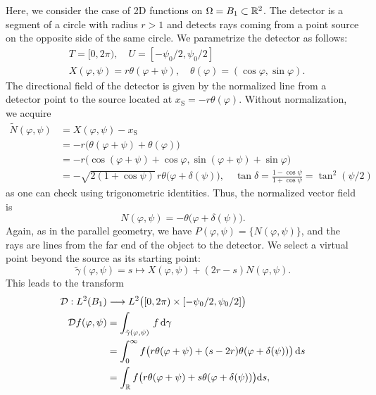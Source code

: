 \documentclass{amsart}
\renewcommand*{\phi}{\varphi}
\begin{document}
\begin{example}
 Here, we consider the case of 2D functions on $\Omega = B_1 \subset {\ensuremath{\mathbb{R}}}^2$. The detector is a segment of a circle with radius $r > 1$ and 
 detects rays coming from a point source on the opposite side of the same circle. We parametrize the detector as follows:
 \begin{align*}
  & T = [0, 2\pi),\quad U = [-\psi_0/2, \psi_0/2] \\
  & X(\phi, \psi) = r \theta(\phi + \psi), \quad \theta(\phi) = (\cos\phi, \sin\phi).
 \end{align*}
 The directional field of the detector is given by the normalized line from a detector point to the source located at 
 $x_{\mathrm{S}} = -r \theta(\phi)$. Without normalization, we acquire
 \begin{align*}
  \tilde N(\phi, \psi) 
  &= X(\phi, \psi) - x_{\mathrm{S}} \\
  &= - r \big(\theta(\phi + \psi) + \theta(\phi)\big) \\
  &= - r \big(\cos(\phi + \psi) + \cos\phi, \sin(\phi + \psi) + \sin\phi \big)\\
  &= - \sqrt{2(1 + \cos\psi)}\, r \theta\big(\phi + \delta(\psi)\big), \quad \tan\delta = \frac{1 - \cos\psi}{1 + \cos\psi} 
  = \tan^2(\psi/2)
 \end{align*}
 as one can check using trigonometric identities. Thus, the normalized vector field is
 \begin{equation}
  N(\phi, \psi) = - \theta\big(\phi + \delta(\psi)\big).
 \end{equation} 
 Again, as in the parallel geometry, we have $P(\phi,\psi) = \lbrace N(\phi,\psi)\rbrace$, and the rays are lines from the far end of 
 the object to the detector. We select a virtual point beyond the source as its starting point:
 \begin{equation*}
  \tilde \gamma(\phi, \psi) = s \mapsto X(\phi,\psi) + (2r-s) N(\phi,\psi).
 \end{equation*}
 This leads to the transform
 \begin{align*}
  \OPD: L^2(B_1) &\Lto L^2\big([0,2\pi) \times [-\psi_0/2, \psi_0/2]\big)\\
  \OPD f(\phi, \psi) 
  &= \int_{\tilde \gamma(\phi,\psi)}\, f \, \D \gamma\\
  &= \int_0^\infty f\big(r\theta(\phi + \psi) + (s-2r)\theta(\phi + \delta(\psi))\big)\, \D s \\
  &= \int_\RR f\big(r\theta(\phi + \psi) + s\theta(\phi + \delta(\psi))\big) \D s,

\end{align*}
\end{example}
\end{document}
